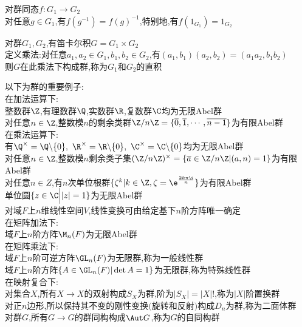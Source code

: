 \begin{zhu}
对群同态$f:G_1\to G_2$\\
对任意$g\in G_1$,有$f(g^{-1})=f(g)^{-1}$,特别地,有$f(1_{G_1})=1_{G_2}$
\end{zhu}

\begin{dingyi}
对群$G_1,G_2$,有笛卡尔积$G=G_1\times G_2$\\
定义乘法:对任意$a_1,a_2\in G_1,b_1,b_2\in G_2$,有$(a_1,b_1)(a_2,b_2)=(a_1a_2,b_1b_2)$\\
则$G$在此乘法下构成群,称为$G_1$和$G_2$的直积
\end{dingyi}

\begin{liz}
以下为群的重要例子:\\
在加法运算下:\\
整数群$\Z$,有理数群$\Q$,实数群$\R$,复数群$\C$均为无限Abel群\\
对任意$n\in \Z$,整数模$n$的剩余类群$\Z/n\Z=\{\overline{0},\overline{1},\cdots,\overline{n-1}\}$为有限Abel群\\
在乘法运算下:\\
有$\Q^{\times}=\Q\backslash \{0\},\ \R^{\times}=\R\backslash \{0\},\ \C^{\times}=\C\backslash \{0\}$均为无限Abel群\\
对任意$n\in \Z$,整数模$n$剩余类子集$(\Z/n\Z)^{\times}=\{\overline{a}\in\Z/n\Z|(a,n)=1\}$为有限Abel群\\
对任意$n\in Z$,有$n$次单位根群$\{\zeta^{k}|k\in \Z,\zeta=\e^{\frac{2k\pi\i}{n}}\}$为有限Abel群\\
单位圆$\{z\in\C\Big| |z|=1\}$为无限Abel群\\
对域$F$上$n$维线性空间$V$,线性变换可由给定基下$n$阶方阵唯一确定\\
在矩阵加法下:\\
域$F$上$n$阶方阵$\M_n(F)$为无限Abel群\\
在矩阵乘法下:\\
域$F$上$n$阶可逆方阵$\GL_n(F)$为无限群,称为一般线性群\\
域$F$上$n$阶方阵$\{A\in\GL_n(F)|\det A=1\}$为无限群,称为特殊线性群\\
在映射复合下:\\
对集合$X$,所有$X\to X$的双射构成$S_{X}$为群,阶为$|S_{X}|=|X|!$,称为$|X|$阶置换群\\
对正$n$边形,所以保持其不变的刚性变换$($旋转和反射$)$构成$D_{n}$为群,称为二面体群\\
对群$G$,所有$G\to G$的群同构构成$\Aut G$,称为$G$的自同构群
\end{liz}

